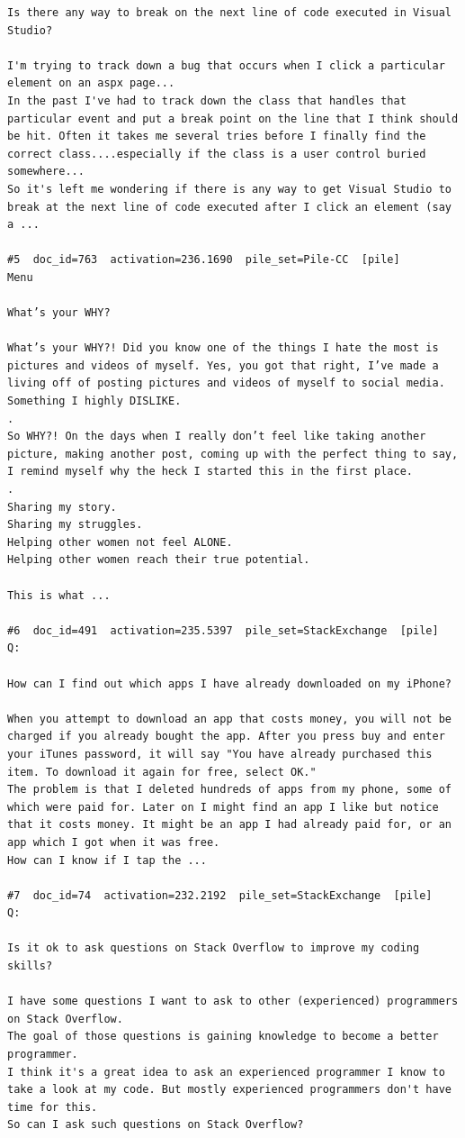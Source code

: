 \begin{verbatim}
Is there any way to break on the next line of code executed in Visual Studio?

I'm trying to track down a bug that occurs when I click a particular element on an aspx page...
In the past I've had to track down the class that handles that particular event and put a break point on the line that I think should be hit. Often it takes me several tries before I finally find the correct class....especially if the class is a user control buried somewhere...
So it's left me wondering if there is any way to get Visual Studio to break at the next line of code executed after I click an element (say a ...

#5  doc_id=763  activation=236.1690  pile_set=Pile-CC  [pile]
Menu

What’s your WHY?

What’s your WHY?! Did you know one of the things I hate the most is pictures and videos of myself. Yes, you got that right, I’ve made a living off of posting pictures and videos of myself to social media. Something I highly DISLIKE.
.
So WHY?! On the days when I really don’t feel like taking another picture, making another post, coming up with the perfect thing to say, I remind myself why the heck I started this in the first place.
.
Sharing my story.
Sharing my struggles.
Helping other women not feel ALONE.
Helping other women reach their true potential.

This is what ...

#6  doc_id=491  activation=235.5397  pile_set=StackExchange  [pile]
Q:

How can I find out which apps I have already downloaded on my iPhone?

When you attempt to download an app that costs money, you will not be charged if you already bought the app. After you press buy and enter your iTunes password, it will say "You have already purchased this item. To download it again for free, select OK."
The problem is that I deleted hundreds of apps from my phone, some of which were paid for. Later on I might find an app I like but notice that it costs money. It might be an app I had already paid for, or an app which I got when it was free.
How can I know if I tap the ...

#7  doc_id=74  activation=232.2192  pile_set=StackExchange  [pile]
Q:

Is it ok to ask questions on Stack Overflow to improve my coding skills?

I have some questions I want to ask to other (experienced) programmers on Stack Overflow.
The goal of those questions is gaining knowledge to become a better programmer.
I think it's a great idea to ask an experienced programmer I know to take a look at my code. But mostly experienced programmers don't have time for this. 
So can I ask such questions on Stack Overflow?


\end{verbatim}
